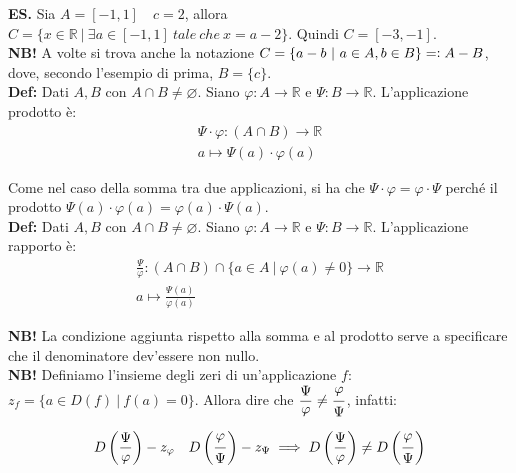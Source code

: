 \documentclass{article}
\begin{document}
\noindent\textbf{ES.} Sia $A = [-1, 1] \quad c = 2$, allora $C = \{x \in \mathbb{R} \ | \ \exists a \in [-1, 1] \ tale \  che \ x = a-2\}$. Quindi $C = [-3, -1]$.\\

\noindent\textbf{NB!} A volte si trova anche la notazione $C = \{a-b \ | \ a \in A, b \in B\} = \vcentcolon A - B$, dove, secondo l'esempio di prima, $B = \{c\}$.\\

\noindent\textbf{Def:} Dati $A, B$ con $A \cap B \neq \varnothing$. Siano $\varphi: A \xrightarrow{} \mathbb{R}$ e $\Psi: B \xrightarrow{} \mathbb{R}$. L'applicazione prodotto è:
\begin{gather*}
    \Psi \cdot \varphi: (A \cap B) \xrightarrow{} \mathbb{R}\\
    a \longmapsto \Psi(a) \cdot \varphi(a)
\end{gather*}

\noindent Come nel caso della somma tra due applicazioni, si ha che $\Psi \cdot \varphi = \varphi \cdot \Psi$ perché il prodotto $\Psi(a) \cdot \varphi(a) = \varphi(a) \cdot \Psi(a)$.\\

\noindent\textbf{Def:} Dati $A, B$ con $A \cap B \neq \varnothing$. Siano $\varphi: A \xrightarrow{} \mathbb{R}$ e $\Psi: B \xrightarrow{} \mathbb{R}$. L'applicazione rapporto è:
\begin{gather*}
    \frac{\Psi}{\varphi}: (A \cap B) \cap \{a \in A \ | \ \varphi(a) \neq 0 \} \xrightarrow{} \mathbb{R} \\
    a \longmapsto \frac{\Psi(a)}{\varphi(a)}
\end{gather*}

\noindent\textbf{NB!} La condizione aggiunta rispetto alla somma e al prodotto serve a specificare che il denominatore dev'essere non nullo. \\

\noindent\textbf{NB!} Definiamo l'insieme degli zeri di un'applicazione $f$: $z_f = \{a \in D(f) \ | \ f(a) = 0\}$. Allora dire che $\dfrac{\Psi}{\raisebox{0.2ex}{$\varphi$}} \neq \dfrac{\raisebox{0.4ex}{$\varphi$}}{\raisebox{-0.3ex}{$\Psi$}}$, infatti:

\begin{equation*}
    D\left(\frac{\Psi}{\varphi}\right) - z_\varphi \quad D\left(\frac{\raisebox{0.4ex}{$\varphi$}}{\raisebox{-0.3ex}{$\Psi$}}\right) - z_\Psi \implies D\left(\frac{\Psi}{\varphi}\right) \neq D\left(\frac{\raisebox{0.4ex}{$\varphi$}}{\raisebox{-0.3ex}{$\Psi$}}\right)
\end{equation*}
\end{document}

